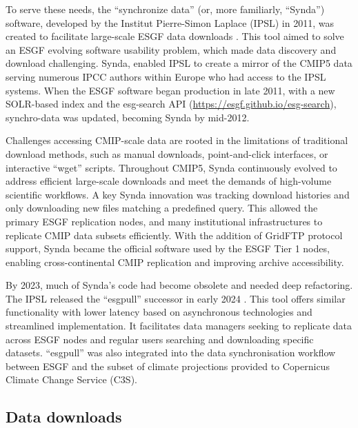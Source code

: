 \documentclass[manuscript]{copernicus}
\def\cred#1{{\color{red}#1}}
\begin{document}
To serve these needs, the ``synchronize data'' (or, more familiarly, ``Synda'') software, developed by the Institut Pierre-Simon Laplace (IPSL) in 2011, was created to facilitate large-scale ESGF data downloads \citep{denvil_synchronize_2020}. This tool aimed to solve an ESGF evolving software usability problem, which made data discovery and download challenging. Synda, enabled IPSL to create a mirror of the CMIP5 data serving numerous IPCC authors within Europe who had access to the IPSL systems. When the ESGF software began production in late 2011, with a new SOLR-based index and the esg-search API (\url{https://esgf.github.io/esg-search}), synchro-data was updated, becoming Synda by mid-2012.

Challenges accessing CMIP-scale data are rooted in the limitations of traditional download methods, such as manual downloads, point-and-click interfaces, or interactive ``wget'' scripts. Throughout CMIP5, Synda continuously evolved to address efficient large-scale downloads and meet the demands of high-volume scientific workflows. A key Synda innovation was tracking download histories and only downloading new files matching a predefined query. This allowed the primary ESGF replication nodes, and many institutional infrastructures to replicate CMIP data subsets efficiently. With the addition of GridFTP protocol support, Synda became the official software used by the ESGF Tier 1 nodes, enabling cross-continental CMIP replication and improving archive accessibility.

By 2023, much of Synda’s code had become obsolete and needed deep refactoring. The IPSL released the ``esgpull'' successor in early 2024 \citep{rodriguez_esgf_2024}. This tool offers similar functionality with lower latency based on asynchronous technologies and streamlined implementation. It facilitates data managers seeking to replicate data across ESGF nodes and regular users searching and downloading specific datasets. ``esgpull'' was also integrated into the data synchronisation workflow between ESGF and the subset of climate projections provided to Copernicus Climate Change Service (C3S).


\subsection{Data downloads}
\label{sec:CMIPDataDownloads}
\end{document}
